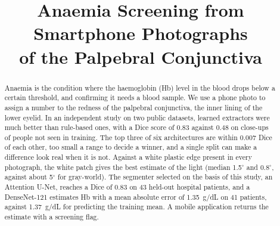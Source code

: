 \documentclass[conference]{IEEEtran}
\begin{document}
\title{Anaemia Screening from Smartphone Photographs\\ of the Palpebral Conjunctiva}

\author{
\and
{}
}

\maketitle
\suppressfloats[t]

\begin{abstract}
Anaemia is the condition where the haemoglobin (Hb) level in the blood drops
below a certain threshold, and confirming it needs a blood sample. We use a
phone photo to assign a number to the redness of the palpebral conjunctiva, the
inner lining of the lower eyelid. In an independent study on two public
datasets, learned extractors were much better than rule-based ones, with a Dice
score of 0.83 against 0.48 on close-ups of people not seen in training. The top
three of six architectures are within 0.007 Dice of each other, too small a
range to decide a winner, and a single split can make a difference look real
when it is not. Against a white plastic edge present in every photograph, the
white patch gives the best estimate of the light (median 1.5$^\circ$ and
0.8$^\circ$, against about 5$^\circ$ for gray-world). The segmenter selected on
the basis of this study, an Attention U-Net, reaches a Dice of 0.83 on 43
held-out hospital patients, and a DenseNet-121 estimates Hb with a mean
absolute error of 1.35~g/dL on 41 patients, against 1.37~g/dL for predicting
the training mean. A mobile application returns the estimate with a screening
flag.
\end{abstract}
\end{document}
